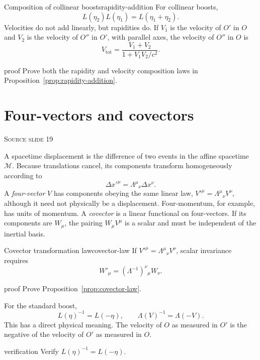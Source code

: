 \documentclass[11pt,a4paper]{article}
\newcommand{\slideref}[1]{%
  \par\smallskip
  {\footnotesize\color{ink!60}\textsc{Source slide #1}}\par
}
\begin{document}
\begin{proposition}{Composition of collinear boosts}{rapidity-addition}
For collinear boosts,
\[
  L(\eta_2)L(\eta_1)=L(\eta_1+\eta_2).
\]
Velocities do not add linearly, but rapidities do.
If \(V_1\) is the velocity of \(O'\) in \(O\) and \(V_2\) is the velocity
of \(O''\) in \(O'\), with parallel axes, the velocity of \(O''\) in \(O\)
is
\[
  V_{\mathrm{tot}}=\frac{V_1+V_2}{1+V_1V_2/c^2}.
\]
\end{proposition}

\begin{studentwork}[height=7.0cm]{proof}
Prove both the rapidity and velocity composition laws in
Proposition~\ref{prop:rapidity-addition}.
\end{studentwork}

\section{Four-vectors and covectors}
\slideref{19}

A spacetime displacement is the difference of two events in the affine
spacetime \(\mathcal M\). Because translations cancel, its components transform
homogeneously according to
\[
  \Delta x'^\mu=\Lambda^\mu{}_\nu\Delta x^\nu.
\]
A \emph{four-vector} \(V\) has components obeying the same linear law,
\(V'^\mu=\Lambda^\mu{}_\nu V^\nu\), although it need not physically be a
displacement. Four-momentum, for example, has units of momentum. A
\emph{covector} is a linear functional on four-vectors. If its components are
\(W_\mu\), the pairing \(W_\mu V^\mu\) is a scalar and must be independent of
the inertial basis.

\begin{proposition}{Covector transformation law}{covector-law}
If \(V'^\mu=\Lambda^\mu{}_\nu V^\nu\), scalar invariance requires
\[
\boxed{
  W'_\mu=(\Lambda^{-1})^\nu{}_\mu W_\nu.
}
\]
\end{proposition}

\begin{studentwork}[height=7.0cm]{proof}
Prove Proposition~\ref{prop:covector-law}.
\end{studentwork}

For the standard boost,
\[
  L(\eta)^{-1}=L(-\eta),
  \qquad
  \Lambda(V)^{-1}=\Lambda(-V).
\]
This has a direct physical meaning. The velocity of \(O\) as measured in
\(O'\) is the negative of the velocity of \(O'\) as measured in \(O\).

\begin{studentwork}[height=5.3cm]{verification}
Verify \(L(\eta)^{-1}=L(-\eta)\).
\end{studentwork}
\end{document}
